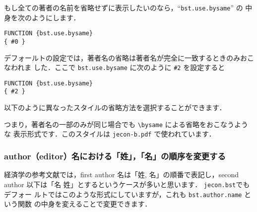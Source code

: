 \documentclass[a4j,10pt]{jarticle}
\newcommand{\bysameline}{\hskip.3em \leavevmode\rule[.5ex]{3em}{.3pt}\hskip0.5em}
\begin{document}
もし全ての著者の名前を省略せずに表示したいのなら，``\texttt{bst.use.bysame}'' の
中身を次のようにします．
\begin{screen}
\begin{verbatim}
FUNCTION {bst.use.bysame}
{ #0 }  
\end{verbatim}
\end{screen}

デフォールトの設定では，著者名の省略は著者名が完全に一致するときのみおこなわれま
した．ここで \texttt{bst.use.bysame} に次のように \texttt{\#2} を設定すると
\begin{screen}
\begin{verbatim}
FUNCTION {bst.use.bysame}
{ #2 }  
\end{verbatim}
\end{screen}

以下のように異なったスタイルの省略方法を選択することができます．
\begin{screen}
\end{screen}
つまり，著者名の一部のみが同じ場合でも \verb|\bysame| による省略をおこなうような
表示形式です．このスタイルは \verb|jecon-b.pdf| で使われています．



\vspace*{1em}

\subsubsection{author（editor）名における「姓」，「名」の順序を変更する}

経済学の参考文献では，first author 名は「姓, 名」の順番で表記し，second author
以下は「名 姓」とするというケースが多いと思います．  \texttt{jecon.bst}でもデフォー
ルトではこのような形式にしていますが，これも \texttt{bst.author.name} という関数
の中身を変えることで変更できます．
\end{document}
